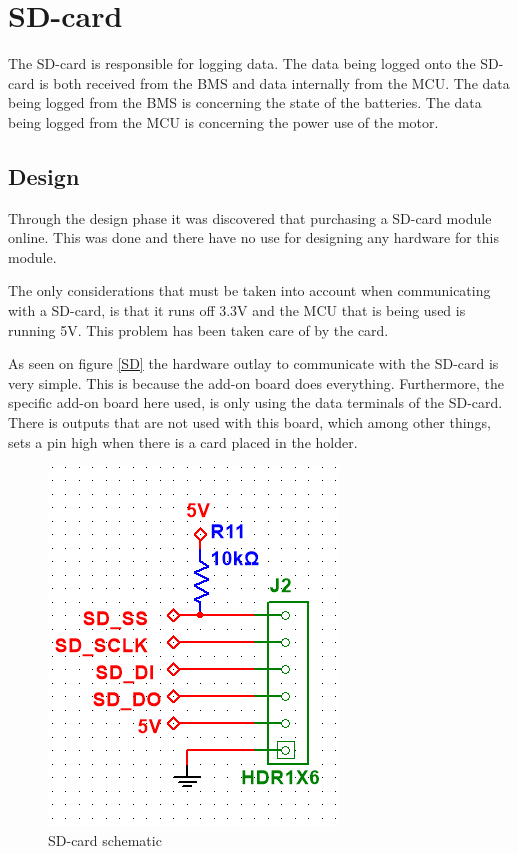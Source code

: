 \section{SD-card}
The SD-card is responsible for logging data. The data being logged onto the SD-card is both received from the BMS and data internally from the MCU. The data being logged from the BMS is concerning the state of the batteries. The data being logged from the MCU is concerning the power use of the motor.

\subsection{Design}
Through the design phase it was discovered that purchasing a SD-card module online. This was done and there have no use for designing any hardware for this module. 

The only considerations that must be taken into account when communicating with a SD-card, is that it runs off 3.3V and the MCU that is being used is running 5V. This problem has been taken care of by the card.

As seen on figure \vref{SD} the hardware outlay to communicate with the SD-card is very simple. This is because the add-on board does everything. Furthermore, the specific add-on board here used, is only using the data terminals of the SD-card. There is outputs that are not used with this board, which among other things, sets a pin high when there is a card placed in the holder. 

\begin{figure}[H]
	\centering
	\includegraphics[width=0.7\linewidth]{Hardware/Pictures/SD_card}
	\caption{SD-card schematic}
	\label{fig:SD}
\end{figure}

